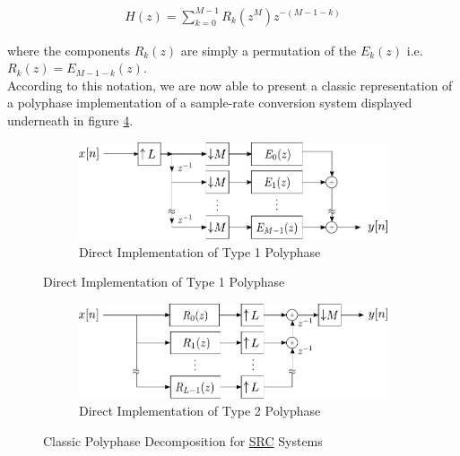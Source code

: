 \begin{align}
	H(z) = \sum\limits_{k=0}^{M-1} R_k(z^M)z^{-(M-1-k)} \label{eqn:poly2}
\end{align}

where the components $R_k(z)$ are simply a permutation of the $E_k(z)$ i.e. $R_k(z) = E_{M-1-k}(z)$.\\ 

According to this notation, we are now able to present a classic representation of a polyphase implementation of a sample-rate conversion system displayed underneath in figure \ref{Figure 3.7}.


\begin{figure}[htb!]
	\centering
	\begin{subfigure}[b]{\textwidth}
		\centering
		\includegraphics[scale=0.95]{polyphase_direct_M.pdf}
		\vspace*{1mm}
		\caption{Direct Implementation of Type 1 Polyphase}\label{3.7.a}
	\end{subfigure}	
\end{figure}

\newpage

\begin{figure}[htb!] \ContinuedFloat
	\centering
	\begin{subfigure}[b]{\textwidth}
		\centering
		\includegraphics[scale=0.95]{polyphase_direct_L.pdf}%
		\vspace*{1mm}
		\caption{Direct Implementation of Type 2 Polyphase}\label{3.7.b}
	\end{subfigure}	
	\caption{Classic Polyphase Decomposition for \protect\hyperlink{SRC}{SRC} Systems}
	\label{Figure 3.7}
\end{figure}

